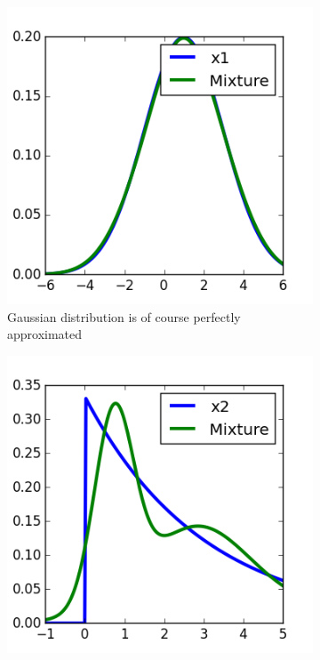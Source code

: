 \documentclass[11pt,a4paper]{book}
\begin{document}
\begin{figure}[h]
  \centering
  \begin{subfigure}[t]{0.3\textwidth}
    \centering
    \includegraphics[width=\textwidth]{thesis/complex/introduction-var-x1}
    \caption{Gaussian distribution is of course perfectly approximated}
  \end{subfigure}
  \hfill
  \begin{subfigure}[t]{0.3\textwidth}
    \centering
    \includegraphics[width=\textwidth]{thesis/complex/introduction-var-x2}

\end{subfigure}
\end{figure}
\end{document}
